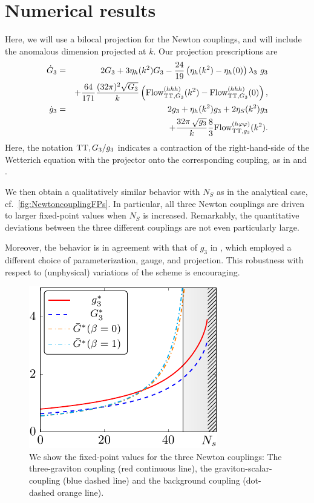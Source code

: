 \documentclass[11pt]{book} %
\newcommand{\bea}{\begin{eqnarray}}
\newcommand{\eea}{\end{eqnarray}}
\begin{document}
\section{Numerical results}
Here, we will use a bilocal projection for the Newton couplings, and will include the anomalous dimension projected at $k$.
Our projection prescriptions are
%
\bea
\dot G_3 &=& 2G_3 + 3 \eta_h(k^2) G_3 -\frac{24}{19}\left(\eta_h(k^2)
    -\eta_h(0)\right)\lambda_3\ g_3 \\
     &{}&+ \frac{64}{171}
  \frac{(32\pi)^2\sqrt{G_3}}{k}\left(\text{Flow}^{(hhh)}_{{\rm TT},G_3}(k^2)-
    \text{Flow}^{(hhh)}_{{\rm TT},G_3}(0)\right),\nonumber\\
    \dot g_3 &=& 2 g_3 + \eta_h(k^2)g_3 +2 \eta_S(k^2)g_3\\
    &{}&+ \frac{32 \pi\, \sqrt{g_3}}{k}\frac{8}{3}\text{Flow}^{(h\varphi\varphi)}_{{\rm TT},g_3}(k^2).\nonumber
\eea
%
Here, the notation ${\rm TT}, G_3/g_3$ indicates a contraction of the right-hand-side of the Wetterich equation with the projector onto the corresponding coupling, as in \cite{Meibohm:2015twa} and \cite{Dona:2013qba}.

We then obtain a qualitatively similar behavior with $N_S$ as in the analytical case, cf.~\autoref{fig:NewtoncouplingFPs}.
In particular, all three Newton couplings are driven to larger fixed-point values when $N_S$ is increased.
Remarkably, the quantitative deviations between the three different couplings are not even particularly large.

Moreover, the behavior is in agreement with that of $g_3$ in \cite{Dona:2015tnf}, which employed a different choice of parameterization, gauge, and projection.
This robustness with respect to (unphysical) variations of the scheme is encouraging.

%
\begin{figure}
\includegraphics[width=\linewidth]{NS_findiff_all_hss_all_g-crop.pdf}
\caption{We show the fixed-point values for the three Newton couplings:
	The three-graviton coupling (red continuous line), the graviton-scalar-coupling (blue dashed line) and the background coupling (dot-dashed orange line).}
\label{fig:NewtoncouplingFPs}
\end{figure}
%
\end{document}
